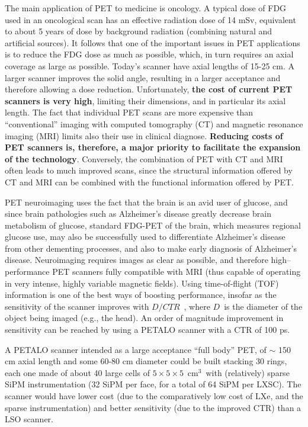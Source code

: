 \documentclass[review]{elsarticle}
\begin{document}
The main application of PET to medicine is oncology. A typical dose of FDG used in an oncological scan has an effective radiation dose of 14 mSv, equivalent to about 5 years of dose by background radiation (combining natural and artificial sources). It follows that one of the important issues in PET applications is to reduce the FDG dose as much as possible, which, in turn requires an axial coverage as large as possible. Today's scanner have axial lengths of 15-25 cm. A larger scanner improves the solid angle, resulting in a larger acceptance and therefore allowing a dose reduction. Unfortunately, {\bf the cost of current PET scanners is very high}, limiting their dimensions, and in particular its axial length. The fact that  individual PET scans are more expensive than ``conventional'' imaging with computed tomography (CT) and magnetic resonance imaging (MRI) limits also their use in clinical diagnose. {\bf Reducing costs of PET scanners is, therefore, a major priority to facilitate the expansion of the technology}. Conversely, the combination of PET with CT and MRI often leads to much improved scans, since the structural information offered by CT and MRI can be combined with the functional information offered by PET. 

PET neuroimaging uses the fact that the brain is an avid user of glucose, and since brain pathologies such as Alzheimer's disease greatly decrease brain metabolism of glucose, standard FDG-PET of the brain, which measures regional glucose use, may also be successfully used to differentiate Alzheimer's disease from other dementing processes, and also to make early diagnosis of Alzheimer's disease. Neuroimaging requires images as clear as possible, and therefore high--performance PET scanners fully compatible with MRI (thus capable of operating in very intense, highly variable magnetic fields). Using time-of-flight (TOF) information is one of the best ways of boosting performance, insofar as the sensitivity of the scanner improves with $D/CTR$~, where $D$~is the diameter of the object being imaged (e.g., the head). An order of magnitude improvement in sensitivity can be reached by using a PETALO scanner with a CTR of 100 ps. 

A PETALO scanner intended as a large acceptance ``full body'' PET, of $\sim$ 150 cm axial length and some 60-80 cm diameter could be built stacking 30 rings, each one made of about 40 large cells of $5 \times 5 \times 5$~cm$^3$~with (relatively) sparse SiPM instrumentation (32 SiPM per face, for a total of 64 SiPM per LXSC). The scanner would have lower cost (due to the comparatively low cost of LXe, and the sparse instrumentation) and better sensitivity (due to the  improved CTR) than a LSO scanner.  
\end{document}
